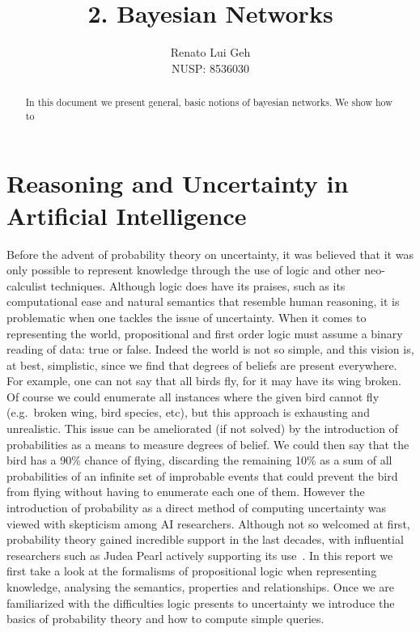 \documentclass{amsart}
\title[]{2. Bayesian Networks}
\author[]{Renato Lui Geh\\NUSP\@: 8536030}
\theoremstyle{plain}
\begin{document}
\begin{abstract}
  In this document we present general, basic notions of bayesian networks. We show how to 
  \vspace*{-2.5em}
\end{abstract}

\maketitle

\section{Reasoning and Uncertainty in Artificial Intelligence}

Before the advent of probability theory on uncertainty, it was believed that it was only possible
to represent knowledge through the use of logic and other neo-calculist techniques. Although logic
does have its praises, such as its computational ease and natural semantics that resemble human
reasoning, it is problematic when one tackles the issue of uncertainty. When it comes to
representing the world, propositional and first order logic must assume a binary reading of data:
true or false. Indeed the world is not so simple, and this vision is, at best, simplistic, since we
find that degrees of beliefs are present everywhere. For example, one can not say that all birds
fly, for it may have its wing broken. Of course we could enumerate all instances where the given
bird cannot fly (e.g.\ broken wing, bird species, etc), but this approach is exhausting and
unrealistic. This issue can be ameliorated (if not solved) by the introduction of probabilities as
a means to measure degrees of belief. We could then say that the bird has a 90\% chance of flying,
discarding the remaining 10\% as a sum of all probabilities of an infinite set of improbable events
that could prevent the bird from flying without having to enumerate each one of them. However the
introduction of probability as a direct method of computing uncertainty was viewed with skepticism
among AI researchers. Although not so welcomed at first, probability theory gained incredible
support in the last decades, with influential researchers such as Judea Pearl actively supporting
its use~\cite{pearl-1988}. In this report we first take a look at the formalisms of propositional
logic when representing knowledge, analysing the semantics, properties and relationships. Once
we are familiarized with the difficulties logic presents to uncertainty we introduce the basics
of probability theory and how to compute simple queries.
\end{document}
